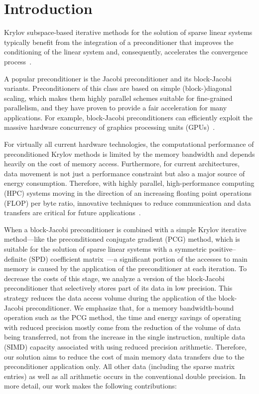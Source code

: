 \section{Introduction}
Krylov subspace-based iterative methods for the solution of sparse linear
systems typically benefit from the integration of a preconditioner that improves
the conditioning of the linear system and, consequently, accelerates the
convergence process~\cite{saad}.

A popular preconditioner is the Jacobi preconditioner and its block-Jacobi 
variants.
Preconditioners of this class are based on simple (block-)diagonal scaling, 
which makes them highly parallel schemes suitable for fine-grained parallelism,
and they have proven to provide a fair acceleration for many applications. 
For example, block-Jacobi preconditioners
can efficiently exploit the massive hardware concurrency of
graphics processing units (GPUs)~\cite{gje,lu}.

For virtually all current hardware technologies, the computational performance 
of
preconditioned Krylov methods is limited by the memory bandwidth and 
depends heavily on the cost of memory access. Furthermore, for current 
architectures, 
data movement is not just a performance constraint but also a major source of
energy consumption. Therefore, with highly parallel, high-performance 
computing (HPC) systems moving in the direction of an increasing
floating point operations (FLOP) per byte ratio, innovative techniques to 
reduce communication and data transfers are critical for future 
applications~\cite{Don14,Dur15,Luc14,Lec13}.

When a block-Jacobi preconditioner is combined with a simple Krylov iterative
method---like the preconditioned conjugate gradient (PCG) method, which is
suitable for the solution of sparse linear systems with a symmetric 
positive--definite 
(SPD) coefficient matrix~\cite{saad}---a significant portion of the accesses to 
main
memory is caused by the application of the preconditioner at
each iteration. To decrease the costs of this stage, we analyze a
version of the block-Jacobi preconditioner that selectively stores part of its
data in low precision. This strategy reduces the data access volume during the
application of the block-Jacobi preconditioner. We emphasize that, for a
memory bandwidth-bound operation such as the PCG method, the time and energy 
savings of
operating with reduced precision mostly come from the reduction of the volume of
data being transferred, not from the increase in the single instruction, 
multiple data (SIMD) 
capacity associated with using reduced precision arithmetic.
Therefore, our solution aims to reduce the cost of main memory data transfers 
due to the
preconditioner application only. All other data (including the sparse matrix
entries) as well as all arithmetic occurs in the conventional double precision.
In more detail, our work makes the following contributions:


